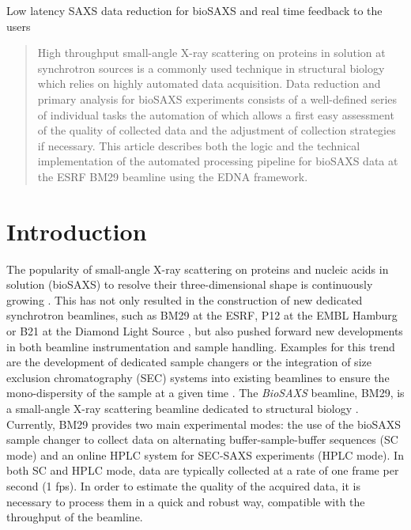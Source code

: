 \documentclass[preprint,pdf]{iucr}              %
\begin{document}

\maketitle                        %

\begin{synopsis}
Low latency SAXS data reduction for bioSAXS and real time feedback to the users
\end{synopsis}

\begin{abstract}
High throughput small-angle X-ray scattering on proteins in solution at
synchrotron sources is a commonly used technique in structural biology which
relies on highly automated data acquisition.
Data reduction and primary analysis for bioSAXS experiments consists of a
well-defined series of individual tasks the automation of which allows a first
easy assessment of the quality of collected data and the adjustment of
collection strategies if necessary. 
This article describes both the logic and the technical implementation of the
automated processing pipeline for bioSAXS data at the ESRF BM29 beamline using
the EDNA framework.
\end{abstract}


\section{Introduction}
The popularity of small-angle X-ray scattering on proteins and nucleic acids in
solution (bioSAXS) to resolve their three-dimensional shape is continuously
growing \cite{Graewert2013,Hura2009,Reyes2014}.
This has not only resulted in the construction of new dedicated
synchrotron beamlines, such as BM29 at the ESRF, P12 at the EMBL Hamburg or B21
at the Diamond Light Source \cite{BM29paper,P12,B21},
but also pushed forward new developments in both beamline instrumentation and sample handling.
Examples for this trend are the development of dedicated sample changers
\cite{SCpaper, SCchess, SCtainer2009, SCslac} or the integration of size
exclusion chromatography (SEC) systems into existing beamlines to ensure the mono-dispersity of the sample at a given
time \cite{SECPaper2012,SECP12,SECSWING,SECbiocat}.
The \textit{BioSAXS} beamline, BM29, is a small-angle
X-ray scattering beamline dedicated to structural biology \cite{BM29paper}.
Currently, BM29 provides two main experimental modes: 
the use of the
bioSAXS sample changer to collect data on alternating buffer-sample-buffer
sequences (SC mode) and an online HPLC system \cite{SECPaper2012} for
SEC-SAXS experiments (HPLC mode).
In both SC and HPLC mode, data are typically collected at a rate of one frame per second
(1 fps).
In order to estimate the quality of the acquired data, it is
necessary to process them in a quick and robust way, compatible with the
throughput of the beamline.
\end{document}
